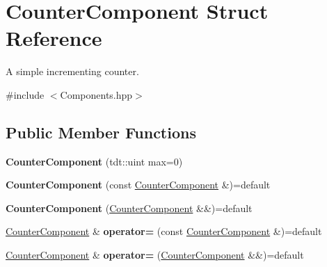 \hypertarget{struct_counter_component}{}\section{Counter\+Component Struct Reference}
\label{struct_counter_component}


A simple incrementing counter.  




{\ttfamily \#include $<$Components.\+hpp$>$}

\subsection*{Public Member Functions}
\begin{DoxyCompactItemize}
\item 
{\bfseries Counter\+Component} (tdt\+::uint max=0)\hypertarget{struct_counter_component_aba4dbdeb9a4d385cb4d128d1f49e94f3}{}\label{struct_counter_component_aba4dbdeb9a4d385cb4d128d1f49e94f3}

\item 
{\bfseries Counter\+Component} (const \hyperlink{struct_counter_component}{Counter\+Component} \&)=default\hypertarget{struct_counter_component_aef348e30a859b0da76737f5d0178a259}{}\label{struct_counter_component_aef348e30a859b0da76737f5d0178a259}

\item 
{\bfseries Counter\+Component} (\hyperlink{struct_counter_component}{Counter\+Component} \&\&)=default\hypertarget{struct_counter_component_afe2269b16b576f2fa05fc25db651de54}{}\label{struct_counter_component_afe2269b16b576f2fa05fc25db651de54}

\item 
\hyperlink{struct_counter_component}{Counter\+Component} \& {\bfseries operator=} (const \hyperlink{struct_counter_component}{Counter\+Component} \&)=default\hypertarget{struct_counter_component_ac812eba966d72dfd7b8a8fd0324bb241}{}\label{struct_counter_component_ac812eba966d72dfd7b8a8fd0324bb241}

\item 
\hyperlink{struct_counter_component}{Counter\+Component} \& {\bfseries operator=} (\hyperlink{struct_counter_component}{Counter\+Component} \&\&)=default\hypertarget{struct_counter_component_a26e3a1029a1ea3c901c5a07b5209fc7a}{}\label{struct_counter_component_a26e3a1029a1ea3c901c5a07b5209fc7a}

\end{DoxyCompactItemize}
